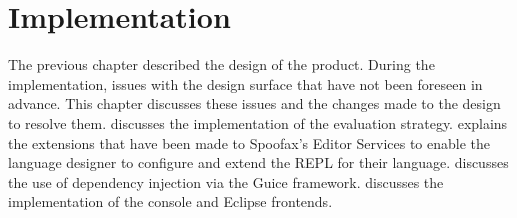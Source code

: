 \chapter{Implementation}
\label{cha:implementation}

The previous chapter described the design of the product. During the
implementation, issues with the design surface that have not been foreseen in
advance. This chapter discusses these issues and the changes made to the design
to resolve them.   discusses the implementation
of the evaluation strategy.  explains the extensions
that have been made to Spoofax's Editor Services to enable the language designer
to configure and extend the REPL for their language. 
discusses the use of dependency injection via the Guice framework.
 discusses the implementation of the console and Eclipse
frontends.





